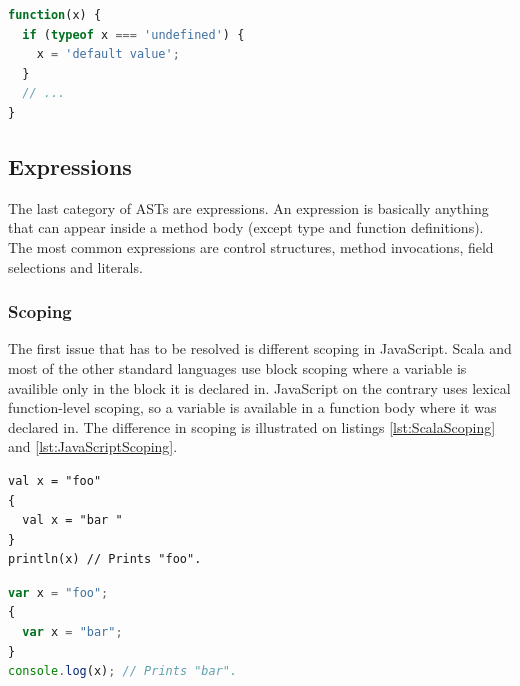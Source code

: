 \documentclass[12pt,a4paper]{report}
\begin{document}
\begin{minipage}{\linewidth}
\begin{lstlisting}[language=JavaScript,caption={Default parameters in JavaScript.},label={lst:JavaScriptDefaultParameters}]
function(x) {
  if (typeof x === 'undefined') {
    x = 'default value';	
  }
  // ...
}
\end{lstlisting}
\end{minipage}

\subsection{Expressions}

The last category of ASTs are expressions. An expression is basically anything that can appear inside a method body (except type and function definitions). The most common expressions are control structures, method invocations, field selections and literals.

\subsubsection*{Scoping}

The first issue that has to be resolved is different scoping in JavaScript. Scala and most of the other standard languages use block scoping where a variable is availible only in the block it is declared in. JavaScript on the contrary uses lexical function-level scoping, so a variable is available in a function body where it was declared in. The difference in scoping is illustrated on listings \ref{lst:ScalaScoping} and \ref{lst:JavaScriptScoping}.

\begin{center}
\begin{minipage}{.48\textwidth}
  \begin{lstlisting}[caption={Scala scoping.},label={lst:ScalaScoping}]
val x = "foo"
{ 
  val x = "bar " 
}
println(x) // Prints "foo".
	\end{lstlisting}
\end{minipage}
\hfill
\begin{minipage}{.48\textwidth}
  \begin{lstlisting}[language=JavaScript,caption={JavaScript scoping.},label={lst:JavaScriptScoping}]
var x = "foo";
{ 
  var x = "bar";
}
console.log(x); // Prints "bar".
  \end{lstlisting}
\end{minipage}
\end{center}
\end{document}

